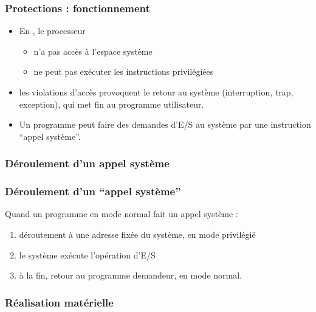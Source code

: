 \documentclass{beamer}
\begin{document}
\begin{frame}
\frametitle{Protections : fonctionnement}

\begin{itemize}
\item En , le processeur 
\begin{itemize}
\item n'a pas accès à l'espace système
\item ne peut pas exécuter les instructions privilégiées
\end{itemize}
\item les \alert{violations d'accès} provoquent le \alert{retour au système}
  (interruption, trap, exception), qui met fin au programme
  utilisateur.

\item Un programme peut faire des demandes d'E/S au système par
une instruction ``\alert{appel système}''.
\end{itemize}
\end{frame}


\subsubsection{Déroulement d'un appel système}

\begin{frame}
\frametitle{Déroulement d'un ``appel système''}

Quand un programme en mode normal fait un appel système :
\begin{enumerate}
\item \alert{déroutement à une adresse fixée} du système, en mode privilégié
\item le système exécute l'opération d'E/S
\item à la fin, \alert{retour} au programme demandeur, en mode normal.
\end{enumerate}
\end{frame}

\subsubsection{Réalisation matérielle}
\end{document}
